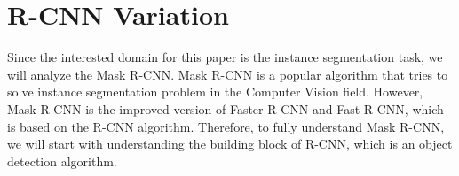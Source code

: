 \chapter{R-CNN Variation} \label{chap:rcnn_variation}

Since the interested domain for this paper is the instance segmentation task,
we will analyze the Mask R-CNN. Mask R-CNN is a popular algorithm that tries to
solve instance segmentation problem in the Computer Vision field. However, Mask
R-CNN is the improved version of Faster R-CNN and Fast R-CNN, which is based on
the R-CNN algorithm. Therefore, to fully understand Mask R-CNN, we will start
with understanding the building block of R-CNN, which is an object detection
algorithm.







